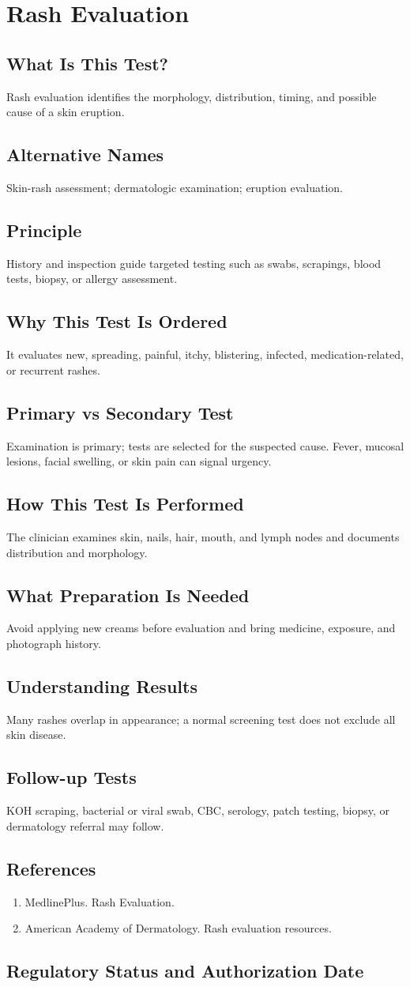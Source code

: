 \chapter{Rash Evaluation}
\section*{What Is This Test?} Rash evaluation identifies the morphology, distribution, timing, and possible cause of a skin eruption.\section*{Alternative Names} Skin-rash assessment; dermatologic examination; eruption evaluation.\section*{Principle} History and inspection guide targeted testing such as swabs, scrapings, blood tests, biopsy, or allergy assessment.\section*{Why This Test Is Ordered} It evaluates new, spreading, painful, itchy, blistering, infected, medication-related, or recurrent rashes.\section*{Primary vs Secondary Test} Examination is primary; tests are selected for the suspected cause. Fever, mucosal lesions, facial swelling, or skin pain can signal urgency.\section*{How This Test Is Performed} The clinician examines skin, nails, hair, mouth, and lymph nodes and documents distribution and morphology.\section*{What Preparation Is Needed} Avoid applying new creams before evaluation and bring medicine, exposure, and photograph history.\section*{Understanding Results} Many rashes overlap in appearance; a normal screening test does not exclude all skin disease.\section*{Follow-up Tests} KOH scraping, bacterial or viral swab, CBC, serology, patch testing, biopsy, or dermatology referral may follow.\section*{References} \begin{enumerate}\item MedlinePlus. Rash Evaluation.\item American Academy of Dermatology. Rash evaluation resources.\end{enumerate}\clearpage\section*{Regulatory Status and Authorization Date}\clearpage
